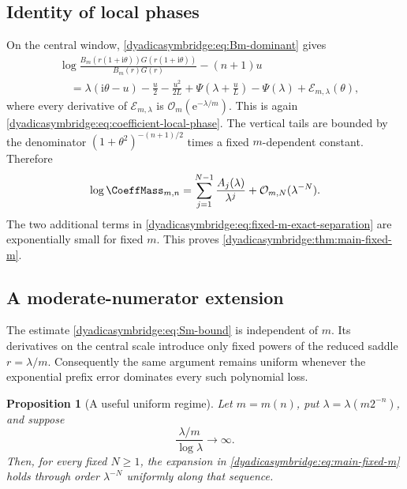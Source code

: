 \documentclass[11pt,oneside]{article}
\newtheorem{proposition}[theorem]{Proposition}
\theoremstyle{definition}
\theoremstyle{remark}
\newcommand{\e}{\mathrm e}
\newcommand{\ii}{\mathrm i}
\newcommand{\bigO}{\mathcal O}
\begin{document}
\subsection{Identity of local phases}

On the central window, \eqref{dyadicasymbridge:eq:Bm-dominant} gives
\begin{align*}
 &\log\frac{B_m(r(1+\ii\theta))G(r(1+\ii\theta))}
 {B_m(r)G(r)}-(n+1)u\\
 &\quad=\lambda(\ii\theta-u)-\frac u2-\frac{u^2}{2L}
 +\Psi\!\left(\lambda+\frac uL\right)-\Psi(\lambda)
 +\mathcal E_{m,\lambda}(\theta),
\end{align*}
where every derivative of $\mathcal E_{m,\lambda}$ is
$\bigO_m(\e^{-\lambda/m})$.  This is again
\eqref{dyadicasymbridge:eq:coefficient-local-phase}.  The vertical tails are bounded by the denominator
$(1+\theta^2)^{-(n+1)/2}$ times a fixed $m$-dependent constant.  Therefore
\begin{equation}
 \log\CoeffMass_{m,n}=
 \sum_{j=1}^{N-1}\frac{A_j(\lambda)}{\lambda^j}
 +\bigO_{m,N}(\lambda^{-N}).
\label{dyadicasymbridge:eq:Cmn-all-orders}
\end{equation}
The two additional terms in \eqref{dyadicasymbridge:eq:fixed-m-exact-separation} are exponentially small for fixed $m$.  This proves \cref{dyadicasymbridge:thm:main-fixed-m}.

\subsection{A moderate-numerator extension}

The estimate \eqref{dyadicasymbridge:eq:Sm-bound} is independent of $m$.  Its derivatives on the central scale introduce only fixed powers of the reduced saddle
$r=\lambda/m$.  Consequently the same argument remains uniform whenever the exponential prefix error dominates every such polynomial loss.

\begin{proposition}[A useful uniform regime]
\label{dyadicasymbridge:prop:moderate-m}
Let $m=m(n)$, put $\lambda=\lambda(m2^{-n})$, and suppose
\begin{equation}
 \frac{\lambda/m}{\log\lambda}\longrightarrow\infty.
\label{dyadicasymbridge:eq:moderate-m-condition}
\end{equation}
Then, for every fixed $N\ge1$, the expansion in \eqref{dyadicasymbridge:eq:main-fixed-m} holds through order $\lambda^{-N}$ uniformly along that sequence.
\end{proposition}
\end{document}
